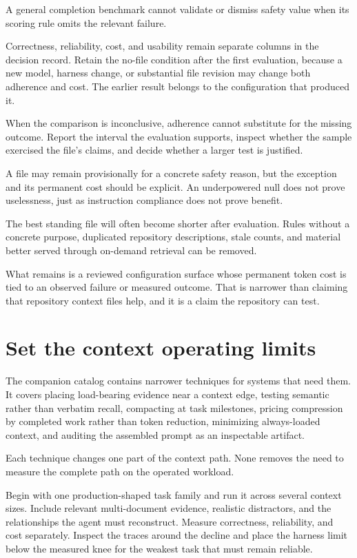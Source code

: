 A general completion benchmark cannot validate or dismiss safety value when its scoring rule omits the relevant failure.

Correctness, reliability, cost, and usability remain separate columns in the decision record. Retain the no-file condition after the first evaluation, because a new model, harness change, or substantial file revision may change both adherence and cost. The earlier result belongs to the configuration that produced it.

When the comparison is inconclusive, adherence cannot substitute for the missing outcome. Report the interval the evaluation supports, inspect whether the sample exercised the file's claims, and decide whether a larger test is justified.

A file may remain provisionally for a concrete safety reason, but the exception and its permanent cost should be explicit. An underpowered null does not prove uselessness, just as instruction compliance does not prove benefit.

The best standing file will often become shorter after evaluation. Rules without a concrete purpose, duplicated repository descriptions, stale counts, and material better served through on-demand retrieval can be removed.

What remains is a reviewed configuration surface whose permanent token cost is tied to an observed failure or measured outcome. That is narrower than claiming that repository context files help, and it is a claim the repository can test.

\hypertarget{set-the-context-operating-limits}{%
\section{Set the context operating limits}\label{set-the-context-operating-limits}}

The companion catalog contains narrower techniques for systems that need them. It covers placing load-bearing evidence near a context edge, testing semantic rather than verbatim recall, compacting at task milestones, pricing compression by completed work rather than token reduction, minimizing always-loaded context, and auditing the assembled prompt as an inspectable artifact.

Each technique changes one part of the context path. None removes the need to measure the complete path on the operated workload.

Begin with one production-shaped task family and run it across several context sizes. Include relevant multi-document evidence, realistic distractors, and the relationships the agent must reconstruct. Measure correctness, reliability, and cost separately. Inspect the traces around the decline and place the harness limit below the measured knee for the weakest task that must remain reliable.

